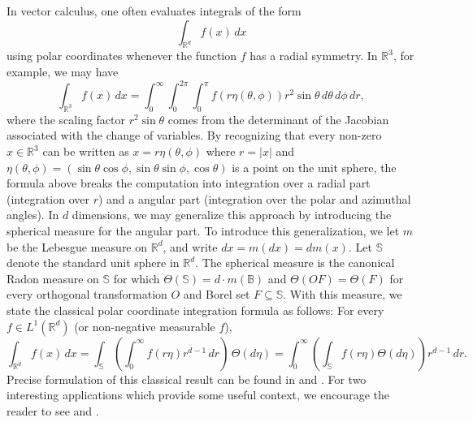 \documentclass[11pt, letter]{book}
\begin{document}
\noindent In vector calculus, one often evaluates integrals of the form
\begin{equation*}
    \int_{\mathbb{R}^d} f(x)\,dx
\end{equation*}
using polar coordinates whenever the function $f$ has a radial symmetry. In $\mathbb{R}^3$, for example, we may have 
\begin{equation*}
    \int_{\mathbb{R}^3} f(x)\,dx = \int_{0}^\infty \int_{0}^{2\pi} \int_0^{\pi} f(r\eta(\theta,\phi)) r^2 \sin\theta \,d\theta\, d\phi \, dr,
\end{equation*}
where the scaling factor $r^2 \sin\theta$ comes from the determinant of the Jacobian associated with the change of variables. By recognizing that every non-zero $x\in\mathbb{R}^3$ can be written as $x=r\eta(\theta,\phi)$ where $r=|x|$ and $\eta(\theta,\phi)=(\sin\theta\cos\phi,\sin\theta\sin\phi,\cos\theta)$ is a point on the unit sphere, the formula above breaks the computation into integration over a radial part (integration over $r$) and a angular part (integration over the polar and azimuthal angles). In $d$ dimensions, we may generalize this approach by introducing the spherical measure for the angular part.  To introduce this generalization, we let $m$ be the Lebesgue measure on $\mathbb{R}^d$, and write $dx=m(dx)=dm(x)$. Let $\mathbb{S}$ denote the standard unit sphere in $\mathbb{R}^d$. The spherical measure is the canonical Radon measure on $\mathbb{S}$ for which $\Theta(\mathbb{S})=d\cdot m(\mathbb{B})$ and $\Theta(OF)=\Theta(F)$ for every orthogonal transformation $O$ and Borel set $F\subseteq\mathbb{S}$. With this measure, we state the classical polar coordinate integration formula as follows: For every $f\in L^1(\mathbb{R}^d)$ (or non-negative measurable $f$),
\begin{equation}\label{eq:StandardPolarIntegrationFormula}
\int_{\mathbb{R}^d}f(x)\,dx=\int_{\mathbb{S}}\left(\int_0^\infty f(r\eta)r^{d-1}\,dr\right)\,\Theta(d\eta)=\int_0^\infty\left(\int_\mathbb{S}f(r\eta)\Theta(d\eta)\right)r^{d-1}\,dr.
\end{equation}
Precise formulation of this classical result can be found in \cite{stein_real_2009} and \cite{folland_real_2013}. For two interesting applications which provide some useful context, we encourage the reader to see \cite{baker_integration_1997} and \cite{folland_how_2001}.\\
\end{document}
